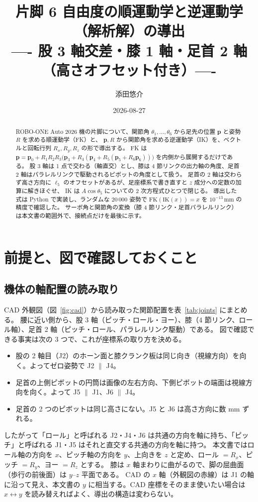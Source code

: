 \documentclass[a4paper,11pt]{ltjsarticle}
\title{片脚 6 自由度の順運動学と逆運動学（解析解）の導出\\
\large ---- 股 3 軸交差・膝 1 軸・足首 2 軸（高さオフセット付き）----}
\author{添田悠介}
\date{2026-08-27}
\newcommand{\Rx}{R_x}\newcommand{\Ry}{R_y}\newcommand{\Rz}{R_z}
\newcommand{\bp}{\boldsymbol{p}}\newcommand{\bo}{\boldsymbol{o}}\newcommand{\br}{\boldsymbol{r}}
\begin{document}
\maketitle

\begin{abstract}
ROBO-ONE Auto 2026 機の片脚について、関節角 $\theta_1,\dots,\theta_6$ から足先の位置 $\bp$ と姿勢 $R$ を求める順運動学（FK）と、
$\bp,R$ から関節角を求める逆運動学（IK）を、ベクトルと回転行列 $\Rx,\Ry,\Rz$ の形で導出する。
FK は
$\bp=\bp_0+R_1R_2R_3\bigl(\bp_3+R_4(\bp_4+R_5(\bp_5+R_6\bp_6))\bigr)$
を内側から展開するだけである。
股 3 軸は 1 点で交わる（軸直交）とし、膝は 4 節リンクの出力軸の角度、足首 2 軸はパラレルリンクで駆動されるピボットの角度として扱う。
足首の 2 軸は交わらず高さ方向に $\ell_5$ のオフセットがあるが、足座標系で書き直すと $z$ 成分への定数の加算に解きほぐせ、
IK は $A\cos\theta_5$ についての 2 次方程式ひとつで閉じる。
導出した式は Python で実装し、ランダムな 20\,000 姿勢で $\mathrm{FK}(\mathrm{IK}(x))=x$ を $10^{-13}\,\mathrm{mm}$ の精度で確認した。
サーボ角と関節角の変換（膝 4 節リンク・足首パラレルリンク）は本文書の範囲外で、接続点だけを最後に示す。
\end{abstract}

\section{前提と、図で確認しておくこと}

\subsection{機体の軸配置の読み取り}
CAD 外観図（図~\ref{fig:cad}）から読み取った関節配置を表~\ref{tab:joints} にまとめる。
腰に近い側から、股 3 軸（ピッチ・ロール・ヨー）、膝（4 節リンク、ロール軸）、足首 2 軸（ピッチ・ロール、パラレルリンク駆動）である。
図で確認できる事実は次の 3 つで、これが座標系の取り方を決める。
\begin{itemize}
\item 股の 2 軸目（J2）のホーン面と膝クランク板は同じ向き（視線方向）を向く。よってゼロ姿勢で J2 $\parallel$ J4。
\item 足首の上側ピボットの円筒は画像の左右方向、下側ピボットの端面は視線方向を向く。よって J5 $\parallel$ J1、J6 $\parallel$ J4。
\item 足首の 2 つのピボットは同じ高さにない。J5 と J6 は高さ方向に数 mm ずれる。
\end{itemize}
したがって「ロール」と呼ばれる J2・J4・J6 は共通の方向を軸に持ち、「ピッチ」と呼ばれる J1・J5 はそれと直交する共通の方向を軸に持つ。
本文書ではロール軸の方向を $x$、ピッチ軸の方向を $y$、上向きを $z$ と定め、ロール $=\Rx$、ピッチ $=\Ry$、ヨー $=\Rz$ とする。
膝は $x$ 軸まわりに曲がるので、脚の屈曲面（歩行の前後面）は $y$--$z$ 平面である。
CAD の $x$ 軸（外観図の赤線）は J1 の軸に沿って見え、本文書の $y$ に相当する。CAD 座標をそのまま使いたい場合は $x\leftrightarrow y$ を読み替えればよく、導出の構造は変わらない。
\end{document}
